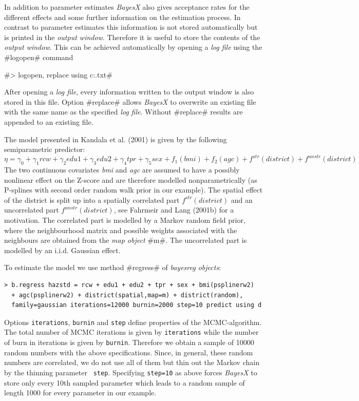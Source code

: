 \documentclass{article}
\begin{document}
In addition to parameter estimates {\it BayesX} also gives
acceptance rates for the different effects and some further
information on the estimation process. In contrast to parameter
estimates this information is not stored automatically but is
printed in the {\it output window}. Therefore it is useful to
store the contents of the {\it output window}. This can be
achieved automatically by opening a {\it log file} using the
#logopen# command

#> logopen, replace using c:\data\logmcmc.txt#

After opening a {\it log file}, every information written to the
output window is also stored in this file. Option #replace# allows
{\it BayesX} to overwrite an existing file with the same name as the
specified {\it log file}. Without #replace# results are appended to
an existing file.

The model presented in Kandala et al. (2001) is given by the
following semiparametric predictor:
\[\eta=\gamma_0+\gamma_1rcw+\gamma_2edu1+\gamma_3edu2+\gamma_4tpr+\gamma_5sex+f_1(bmi)+f_2(agc)+f^{str}(district)+f^{unstr}(district)\]
The two continuous covariates {\em bmi} and {\em agc} are assumed to
have a possibly nonlinear effect on the Z-score and are therefore
modelled nonparametrically (as P-splines with second order random
walk prior in our example). The spatial effect of the district is
split up into a spatially correlated part $ f^{str}(district)$ and
an uncorrelated part $f^{unstr}(district)$, see Fahrmeir and Lang
(2001b) \nocite{fahlan01b} for a motivation. The correlated part is
modelled by a Markov random field prior, where the neighbourhood
matrix and possible weights associated with the neighbours are
obtained from the {\it map object} #m#. The uncorrelated part is
modelled by an i.i.d. Gaussian effect.

To estimate the model we use method #regress# of {\em bayesreg
objects}:
\begin{verbatim}
> b.regress hazstd = rcw + edu1 + edu2 + tpr + sex + bmi(psplinerw2)
  + agc(psplinerw2) + district(spatial,map=m) + district(random),
  family=gaussian iterations=12000 burnin=2000 step=10 predict using d
\end{verbatim}

Options {\tt iterations}, {\tt burnin} and {\tt step} define
properties of the MCMC-algorithm. The total number of MCMC
iterations is given by {\tt iterations} while the number of burn in
iterations is given by {\tt burnin}. Therefore we obtain a sample of
10000 random numbers with the above specifications. Since, in
general, these random numbers are correlated, we do not use all of
them but thin out the Markov chain by the thinning parameter {\tt
step}. Specifying {\tt step=10} as above forces {\em BayesX} to
store only every 10th sampled parameter which leads to a random
sample of length 1000 for every parameter in our example.
\end{document}
